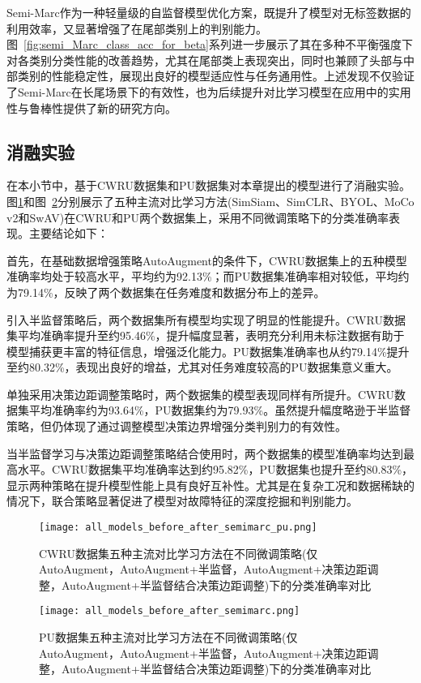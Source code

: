 \documentclass[master]{thesis-uestc}
\begin{document}
Semi-Marc作为一种轻量级的自监督模型优化方案，既提升了模型对无标签数据的利用效率，又显著增强了在尾部类别上的判别能力。图~\ref{fig:semi_Marc_class_acc_for_beta}系列进一步展示了其在多种不平衡强度下对各类别分类性能的改善趋势，尤其在尾部类上表现突出，同时也兼顾了头部与中部类别的性能稳定性，展现出良好的模型适应性与任务通用性。上述发现不仅验证了Semi-Marc在长尾场景下的有效性，也为后续提升对比学习模型在应用中的实用性与鲁棒性提供了新的研究方向。


\subsection{消融实验}
在本小节中，基于CWRU数据集和PU数据集对本章提出的模型进行了消融实验。图\ref{fig:all_models_before_after_SemiMarc}和图~\ref{fig:all_models_before_after_SemiMarc_pu}分别展示了五种主流对比学习方法(SimSiam、SimCLR、BYOL、MoCo v2和SwAV)在CWRU和PU两个数据集上，采用不同微调策略下的分类准确率表现。主要结论如下：

首先，在基础数据增强策略AutoAugment的条件下，CWRU数据集上的五种模型准确率均处于较高水平，平均约为92.13\%；而PU数据集准确率相对较低，平均约为79.14\%，反映了两个数据集在任务难度和数据分布上的差异。

引入半监督策略后，两个数据集所有模型均实现了明显的性能提升。CWRU数据集平均准确率提升至约95.46\%，提升幅度显著，表明充分利用未标注数据有助于模型捕获更丰富的特征信息，增强泛化能力。PU数据集准确率也从约79.14\%提升至约80.32\%，表现出良好的增益，尤其对任务难度较高的PU数据集意义重大。

单独采用决策边距调整策略时，两个数据集的模型表现同样有所提升。CWRU数据集平均准确率约为93.64\%，PU数据集约为79.93\%。虽然提升幅度略逊于半监督策略，但仍体现了通过调整模型决策边界增强分类判别力的有效性。

当半监督学习与决策边距调整策略结合使用时，两个数据集的模型准确率均达到最高水平。CWRU数据集平均准确率达到约95.82\%，PU数据集也提升至约80.83\%，显示两种策略在提升模型性能上具有良好互补性。尤其是在复杂工况和数据稀缺的情况下，联合策略显著促进了模型对故障特征的深度挖掘和判别能力。

\begin{figure}[H]
    \centering
    \texttt{[image: all\_models\_before\_after\_semimarc\_pu.png]}
    \caption{CWRU数据集五种主流对比学习方法在不同微调策略(仅 AutoAugment，AutoAugment+半监督，AutoAugment+决策边距调整，AutoAugment+半监督结合决策边距调整)下的分类准确率对比}
    \label{fig:all_models_before_after_SemiMarc}
\end{figure}

\begin{figure}[H]
    \centering
    \texttt{[image: all\_models\_before\_after\_semimarc.png]}
    \caption{PU数据集五种主流对比学习方法在不同微调策略(仅 AutoAugment，AutoAugment+半监督，AutoAugment+决策边距调整，AutoAugment+半监督结合决策边距调整)下的分类准确率对比}
    \label{fig:all_models_before_after_SemiMarc_pu}
\end{figure}
\end{document}

